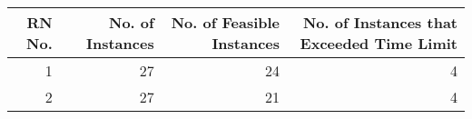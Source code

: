 \begin{tabular}{rrrr}
\toprule
RN No. & No. of Instances & No. of Feasible Instances & No. of Instances that Exceeded Time Limit \\
\midrule
1 & 27 & 24 & 4 \\
2 & 27 & 21 & 4 \\
\bottomrule
\end{tabular}
